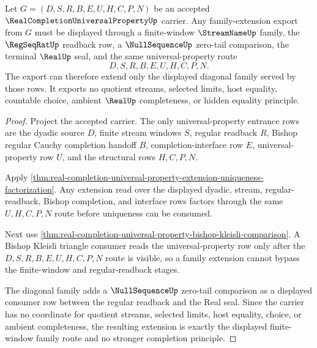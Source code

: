 \begin{theorem}
\label{thm:real-completion-universal-property-diagonal-family-extension}
Let $G=(D,S,R,B,E,U,H,C,P,N)$ be an accepted $\RealCompletionUniversalPropertyUp$ carrier. Any family-extension export from $G$ must be displayed through a finite-window $\StreamNameUp$ family, the $\RegSeqRatUp$ readback row, a $\NullSequenceUp$ zero-tail comparison, the terminal $\RealUp$ seal, and the same universal-property route
$$
D,S,R,B,E,U,H,C,P,N .
$$
The export can therefore extend only the displayed diagonal family served by those rows. It exports no quotient streams, selected limits, host equality, countable choice, ambient $\RealUp$ completeness, or hidden equality principle.
\end{theorem}
\begin{proof}
Project the accepted carrier. The only universal-property entrance rows are the dyadic source $D$, finite stream windows $S$, regular readback $R$, Bishop regular Cauchy completion handoff $B$, completion-interface row $E$, universal-property row $U$, and the structural rows $H,C,P,N$.

Apply \autoref{thm:real-completion-universal-property-extension-uniqueness-factorization}. Any extension read over the displayed dyadic, stream, regular-readback, Bishop completion, and interface rows factors through the same $U,H,C,P,N$ route before uniqueness can be consumed.

Next use \autoref{thm:real-completion-universal-property-bishop-kleisli-comparison}. A Bishop Kleisli triangle consumer reads the universal-property row only after the $D,S,R,B,E,U,H,C,P,N$ route is visible, so a family extension cannot bypass the finite-window and regular-readback stages.

The diagonal family adds a $\NullSequenceUp$ zero-tail comparison as a displayed consumer row between the regular readback and the Real seal. Since the carrier has no coordinate for quotient streams, selected limits, host equality, choice, or ambient completeness, the resulting extension is exactly the displayed finite-window family route and no stronger completion principle.
\end{proof}

